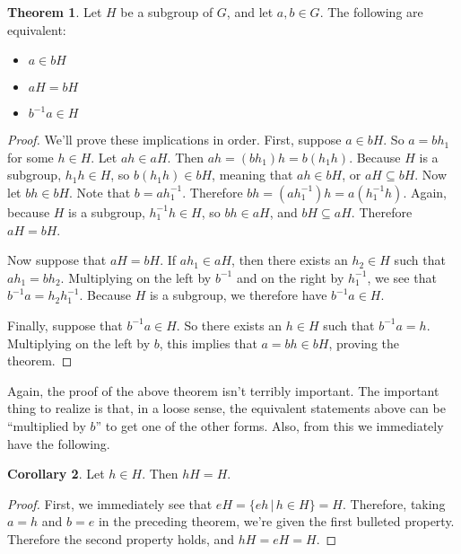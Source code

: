 \documentclass[12pt]{article}
\newcommand{\inv}[1]{#1^{-1}}
\theoremstyle{definition}
\newtheorem{theorem}{Theorem}[section]
\theoremstyle{definition}
\theoremstyle{definition}
\theoremstyle{definition}
\newtheorem{corollary}[theorem]{Corollary}
\begin{document}
\begin{theorem}
\label{cosets}
Let $H$ be a subgroup of $G$, and let $a, b \in G$. The following are equivalent:
\begin{itemize}
\item $a \in bH$
\item $aH = bH$
\item $\inv{b}a \in H$
\end{itemize}
\end{theorem}

\begin{proof}

We'll prove these implications in order. First, suppose $a \in bH$. So $a = bh_1$ for some $h \in H$. Let $ah \in aH$. Then $ah = (bh_1)h = b(h_1 h)$. Because $H$ is a subgroup, $h_1 h \in H$, so $b(h_1 h) \in bH$, meaning that $ah \in bH$, or $aH \subseteq bH$. Now let $bh \in bH$. Note that $b = a \inv{h_1}$. Therefore $bh = (a \inv{h_1})h = a (\inv{h_1}h)$. Again, because $H$ is a subgroup, $\inv{h_1} h \in H$, so $bh \in aH$, and $bH \subseteq aH$. Therefore $aH = bH$.

Now suppose that $aH = bH$. If $ah_1 \in aH$, then there exists an $h_2 \in H$ such that $ah_1 = bh_2$. Multiplying on the left by $\inv{b}$ and on the right by $\inv{h_1}$, we see that $\inv{b}a = h_2 \inv{h_1}$. Because $H$ is a subgroup, we therefore have $\inv{b}a \in H$.

Finally, suppose that $\inv{b}a \in H$. So there exists an $h \in H$ such that $\inv{b}a = h$. Multiplying on the left by $b$, this implies that $a = bh \in bH$, proving the theorem.

\end{proof}

Again, the proof of the above theorem isn't terribly important. The important thing to realize is that, in a loose sense, the equivalent statements above can be ``multiplied by $b$'' to get one of the other forms. Also, from this we immediately have the following.

\begin{corollary}
\label{cosetcorollary}
Let $h \in H$. Then $hH = H$.
\end{corollary}

\begin{proof}
First, we immediately see that $eH = \{eh \,|\, h \in H\} = H$. Therefore, taking $a=h$ and $b=e$ in the preceding theorem, we're given the first bulleted property. Therefore the second property holds, and $hH = eH = H$.

\end{proof}
\end{document}
